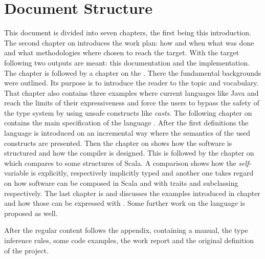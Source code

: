 \section{Document Structure}
This document is divided into seven chapters, the first being this introduction. The second chapter on
\emph{} introduces the work plan: how and
when what was done and what methodologies where chosen to reach
the target. With the target following two outputs are meant: this documentation and
the implementation. The chapter is followed by a chapter on the
\emph{}. There the fundamental
backgrounds were outlined. Its purpose is to introduce the
reader to the topic and vocabulary. That chapter also contains three examples
where current languages like Java and \cs reach the limits of their expressiveness
and force the users to bypass the safety of the type system
by using unsafe constructs like \emph{casts}. The following
chapter on \emph{} contains
the main specification of the language \ooplss. After the first
definitions the language is introduced on an incremental way where
the semantics of the used constructs are presented. Then the chapter on
\emph{} shows how the software is
structured and how the compiler is designed. This is followed by the
chapter on \emph{} which compares \ooplss to some structures of Scala. A comparison shows how the
\emph{self}-variable is explicitly, respectively implicitly typed and
another one takes regard on how software can be composed in Scala and \ooplss
with traits and subclassing respectively.
The last chapter is \emph{}
and discusses the examples introduced in chapter
\emph{} and how those can be expressed
with \ooplss. Some further work on the language is proposed as well.

After the regular content follows the appendix, containing a manual, the type
inference rules, some code examples, the work report and the original
definition of the project.

